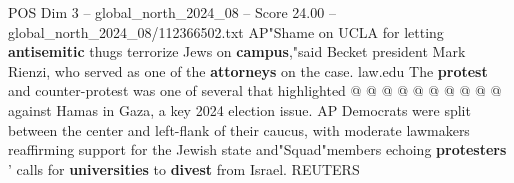 \begin{textsample}{POS Dim 3 – global\_north\_2024\_08 – Score 24.00 – global\_north\_2024\_08/112366502.txt}
AP"Shame on UCLA for letting \textbf{antisemitic} thugs terrorize Jews on \textbf{campus},"said Becket president Mark Rienzi, who served as one of the \textbf{attorneys} on the case. law.edu The \textbf{protest} and counter-protest was one of several that highlighted @ @ @ @ @ @ @ @ @ @ against Hamas in Gaza, a key 2024 election issue.
AP Democrats were split between the center and left-flank of their caucus, with moderate lawmakers reaffirming support for the Jewish state and"Squad"members echoing \textbf{protesters} ' calls for \textbf{universities} to \textbf{divest} from Israel.
REUTERS

\end{textsample}
